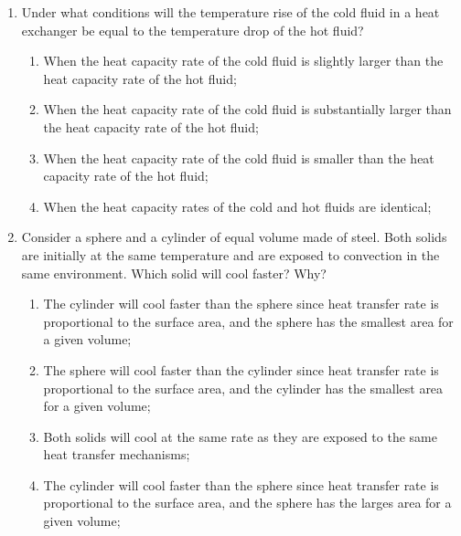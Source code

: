 \documentclass[12pts,a4paper,amsmath,amssymb,floatfix]{article}%
\begin{document}
\begin{enumerate}
%
\item Under what conditions will the temperature rise of the cold fluid in a heat exchanger be equal to the temperature
drop of the hot fluid? %
\begin{enumerate}
 \item When the heat capacity rate of the cold fluid is slightly larger than the heat capacity rate of the hot fluid; 
 \item When the heat capacity rate of the cold fluid is substantially larger than the heat capacity rate of the hot fluid; 
 \item When the heat capacity rate of the cold fluid is smaller than the heat capacity rate of the hot fluid;
 \item When the heat capacity rates of the cold and hot fluids are identical; %
\end{enumerate}
%
\item Consider a sphere and a cylinder of equal volume made of steel. Both solids are initially at the same temperature and are exposed to convection in the same environment. Which solid will cool faster? Why? %
\begin{enumerate}
 \item The cylinder will cool faster than the sphere since heat transfer rate is proportional to the surface area,
and the sphere has the smallest area for a given volume; %
 \item The sphere will cool faster than the cylinder since heat transfer rate is proportional to the surface area,
and the cylinder has the smallest area for a given volume;
 \item Both solids will cool at the same rate as they are exposed to the same heat transfer mechanisms;
 \item The cylinder will cool faster than the sphere since heat transfer rate is proportional to the surface area,
and the sphere has the larges area for a given volume; 
\end{enumerate}
%
%



%
\end{enumerate}
\end{document}
